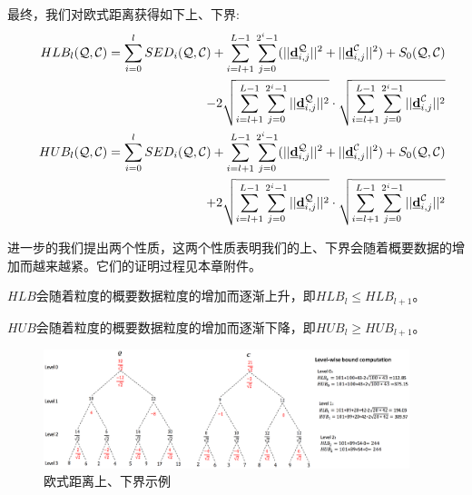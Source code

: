 最终，我们对欧式距离获得如下上、下界:
\allowdisplaybreaks
\begin{align} \label{eq:HaarBound}
&&	HLB_{l}({\cal Q},{\cal C}) =\sum_{i=0}^{l}SED_{i}({\cal Q},{\cal C})+
\sum_{i=l+1}^{L-1}\sum_{j=0}^{2^i-1}(||\emph{{\textbf{d}}}_{i,j}^{\cal Q}||^2+||\emph{{\textbf{d}}}_{i,j}^{\cal C}||^2)+ S_{0}({\cal Q},{\cal C}) \\
&&  - 2\sqrt{\sum_{i=l+1}^{L-1}\sum_{j=0}^{2^i-1}||\emph{{\textbf{d}}}_{i,j}^{\cal Q}||^2} \cdot \sqrt{\sum_{i=l+1}^{L-1}\sum_{j=0}^{2^i-1}||\emph{{\textbf{d}}}_{i,j}^{\cal C}||^2} \nonumber \\
&&	HUB_{l}({\cal Q},{\cal C}) = \sum_{i=0}^{l}SED_{i}({\cal Q},{\cal C})+
\sum_{i=l+1}^{L-1}\sum_{j=0}^{2^i-1}(||\emph{{\textbf{d}}}_{i,j}^{\cal Q}||^2+||\emph{{\textbf{d}}}_{i,j}^{\cal C}||^2)+S_{0}({\cal Q},{\cal C}) 
\nonumber \\
&&\qquad \quad + 2\sqrt{\sum_{i=l+1}^{L-1}\sum_{j=0}^{2^i-1}||\emph{{\textbf{d}}}_{i,j}^{\cal Q}||^2} \cdot \sqrt{\sum_{i=l+1}^{L-1}\sum_{j=0}^{2^i-1}||\emph{{\textbf{d}}}_{i,j}^{\cal C}||^2}
\end{align}
\allowdisplaybreaks[4]

进一步的我们提出两个性质，这两个性质表明我们的上、下界会随着概要数据的增加而越来越紧。它们的证明过程见本章附件。
\begin{theorem}[]\label{theory:lower}
	$HLB$会随着粒度的概要数据粒度的增加而逐渐上升，即$HLB_{l} \le HLB_{l+1}$。
\end{theorem}

\begin{theorem}[]\label{theory:upper}
	$HUB$会随着粒度的概要数据粒度的增加而逐渐下降，即$HUB_{l} \ge HUB_{l+1}$。
\end{theorem}

\begin{figure}
	\centering
	\includegraphics[width=0.95\textwidth]{Fig/chapter4/bound}
	\caption{欧式距离上、下界示例}
	\label{fig-chapter4-bound}
\end{figure}

